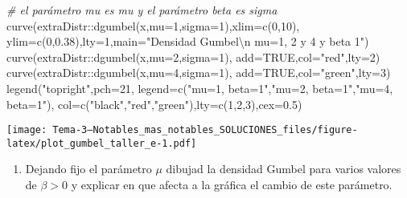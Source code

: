 \documentclass[
]{article}
\newenvironment{Shaded}{\begin{snugshade}}{\end{snugshade}}
\newcommand{\AttributeTok}[1]{\textcolor[rgb]{0.77,0.63,0.00}{#1}}
\newcommand{\CommentTok}[1]{\textcolor[rgb]{0.56,0.35,0.01}{\textit{#1}}}
\newcommand{\ConstantTok}[1]{\textcolor[rgb]{0.00,0.00,0.00}{#1}}
\newcommand{\DecValTok}[1]{\textcolor[rgb]{0.00,0.00,0.81}{#1}}
\newcommand{\FloatTok}[1]{\textcolor[rgb]{0.00,0.00,0.81}{#1}}
\newcommand{\FunctionTok}[1]{\textcolor[rgb]{0.00,0.00,0.00}{#1}}
\newcommand{\NormalTok}[1]{#1}
\newcommand{\SpecialCharTok}[1]{\textcolor[rgb]{0.00,0.00,0.00}{#1}}
\newcommand{\StringTok}[1]{\textcolor[rgb]{0.31,0.60,0.02}{#1}}
\providecommand{\tightlist}{%
  \setlength{\itemsep}{0pt}\setlength{\parskip}{0pt}}
\begin{document}
\begin{Shaded}
\begin{Highlighting}[]
\CommentTok{\# el parámetro mu es mu y el parámetro beta es sigma}
\FunctionTok{curve}\NormalTok{(extraDistr}\SpecialCharTok{::}\FunctionTok{dgumbel}\NormalTok{(x,}\AttributeTok{mu=}\DecValTok{1}\NormalTok{,}\AttributeTok{sigma=}\DecValTok{1}\NormalTok{),}\AttributeTok{xlim=}\FunctionTok{c}\NormalTok{(}\DecValTok{0}\NormalTok{,}\DecValTok{10}\NormalTok{),}
      \AttributeTok{ylim=}\FunctionTok{c}\NormalTok{(}\DecValTok{0}\NormalTok{,}\FloatTok{0.38}\NormalTok{),}\AttributeTok{lty=}\DecValTok{1}\NormalTok{,}\AttributeTok{main=}\StringTok{"Densidad  Gumbel}\SpecialCharTok{\textbackslash{}n}\StringTok{ mu=1, 2 y 4  y beta 1"}\NormalTok{)}
\FunctionTok{curve}\NormalTok{(extraDistr}\SpecialCharTok{::}\FunctionTok{dgumbel}\NormalTok{(x,}\AttributeTok{mu=}\DecValTok{2}\NormalTok{,}\AttributeTok{sigma=}\DecValTok{1}\NormalTok{),}
      \AttributeTok{add=}\ConstantTok{TRUE}\NormalTok{,}\AttributeTok{col=}\StringTok{"red"}\NormalTok{,}\AttributeTok{lty=}\DecValTok{2}\NormalTok{)}
\FunctionTok{curve}\NormalTok{(extraDistr}\SpecialCharTok{::}\FunctionTok{dgumbel}\NormalTok{(x,}\AttributeTok{mu=}\DecValTok{4}\NormalTok{,}\AttributeTok{sigma=}\DecValTok{1}\NormalTok{),}
      \AttributeTok{add=}\ConstantTok{TRUE}\NormalTok{,}\AttributeTok{col=}\StringTok{"green"}\NormalTok{,}\AttributeTok{lty=}\DecValTok{3}\NormalTok{)}
\FunctionTok{legend}\NormalTok{(}\StringTok{"topright"}\NormalTok{,}\AttributeTok{pch=}\DecValTok{21}\NormalTok{,}
       \AttributeTok{legend=}\FunctionTok{c}\NormalTok{(}\StringTok{"mu=1, beta=1"}\NormalTok{,}\StringTok{"mu=2, beta=1"}\NormalTok{,}\StringTok{"mu=4, beta=1"}\NormalTok{),}
       \AttributeTok{col=}\FunctionTok{c}\NormalTok{(}\StringTok{"black"}\NormalTok{,}\StringTok{"red"}\NormalTok{,}\StringTok{"green"}\NormalTok{),}\AttributeTok{lty=}\FunctionTok{c}\NormalTok{(}\DecValTok{1}\NormalTok{,}\DecValTok{2}\NormalTok{,}\DecValTok{3}\NormalTok{),}\AttributeTok{cex=}\FloatTok{0.5}\NormalTok{)}
\end{Highlighting}
\end{Shaded}

\texttt{[image: Tema-3---Notables\_mas\_notables\_SOLUCIONES\_files/figure-latex/plot\_gumbel\_taller\_e-1.pdf]}

\begin{enumerate}
\def\labelenumi{\alph{enumi})}
\setcounter{enumi}{3}
\tightlist
\item
  Dejando fijo el parámetro \(\mu\) dibujad la densidad Gumbel para
  varios valores de \(\beta>0\) y explicar en que afecta a la gráfica el
  cambio de este parámetro.
\end{enumerate}
\end{document}
